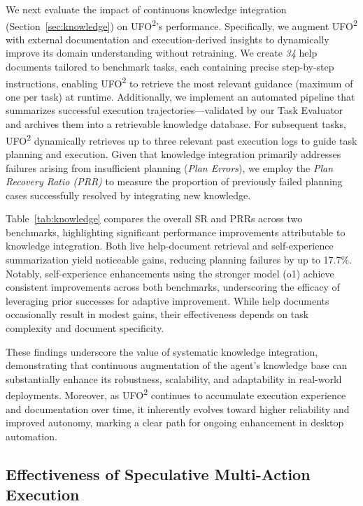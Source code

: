 \documentclass[sigplan,10pt]{acmart}
\newcommand{\name}{\textsc{UFO}\textsuperscript{2}\xspace}
\begin{document}
We next evaluate the impact of continuous knowledge integration (Section~\ref{sec:knowledge}) on \name's performance. Specifically, we augment \name with external documentation and execution-derived insights to dynamically improve its domain understanding without retraining. We create \textit{34} help documents tailored to benchmark tasks, each containing precise step-by-step instructions, enabling \name to retrieve the most relevant guidance (maximum of one per task) at runtime. Additionally, we implement an automated pipeline that summarizes successful execution trajectories—validated by our Task Evaluator and archives them into a retrievable knowledge database. For subsequent tasks, \name dynamically retrieves up to three relevant past execution logs to guide task planning and execution. Given that knowledge integration primarily addresses failures arising from insufficient planning (\textit{Plan Errors}), we employ the \emph{Plan Recovery Ratio (PRR)} to measure the proportion of previously failed planning cases successfully resolved by integrating new knowledge.

Table~\ref{tab:knowledge} compares the overall SR and PRRs across two benchmarks, highlighting significant performance improvements attributable to knowledge integration. Both live help-document retrieval and self-experience summarization yield noticeable gains, reducing planning failures by up to 17.7\%. Notably, self-experience enhancements using the stronger model (o1) achieve consistent improvements across both benchmarks, underscoring the efficacy of leveraging prior successes for adaptive improvement. While help documents occasionally result in modest gains, their effectiveness depends on task complexity and document specificity.

These findings underscore the value of systematic knowledge integration, demonstrating that continuous augmentation of the agent's knowledge base can substantially enhance its robustness, scalability, and adaptability in real-world deployments. Moreover, as \name continues to accumulate execution experience and documentation over time, it inherently evolves toward higher reliability and improved autonomy, marking a clear path for ongoing enhancement in desktop automation.


\subsection{Effectiveness of Speculative Multi-Action Execution} \label{sec:speculative_eval}
\end{document}
